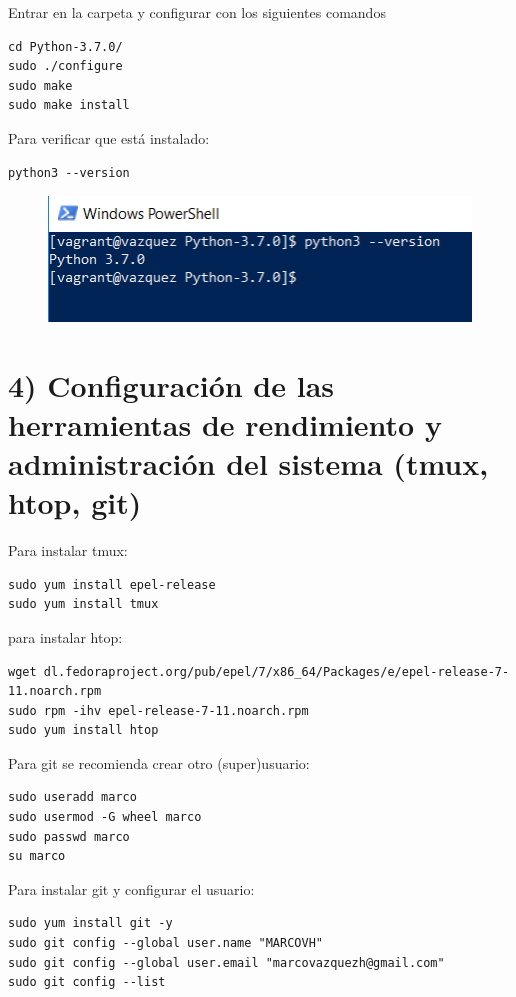 \documentclass[]{article}
\begin{document}
Entrar en la carpeta y configurar con los siguientes comandos

\begin{verbatim}
cd Python-3.7.0/
sudo ./configure
sudo make
sudo make install
\end{verbatim}

Para verificar que está instalado:

\begin{verbatim}
python3 --version
\end{verbatim}

\begin{figure}[htbp]
\centering
\includegraphics{python.png}
\end{figure}

\section{4) Configuración de las herramientas de rendimiento y
administración del sistema (tmux, htop,
git)}\label{configuracion-de-las-herramientas-de-rendimiento-y-administracion-del-sistema-tmux-htop-git}

Para instalar tmux:

\begin{verbatim}
sudo yum install epel-release
sudo yum install tmux
\end{verbatim}

para instalar htop:

\begin{verbatim}
wget dl.fedoraproject.org/pub/epel/7/x86_64/Packages/e/epel-release-7-11.noarch.rpm
sudo rpm -ihv epel-release-7-11.noarch.rpm 
sudo yum install htop
\end{verbatim}

Para git se recomienda crear otro (super)usuario:

\begin{verbatim}
sudo useradd marco
sudo usermod -G wheel marco
sudo passwd marco
su marco
\end{verbatim}

Para instalar git y configurar el usuario:

\begin{verbatim}
sudo yum install git -y
sudo git config --global user.name "MARCOVH"
sudo git config --global user.email "marcovazquezh@gmail.com"
sudo git config --list
\end{verbatim}
\end{document}
